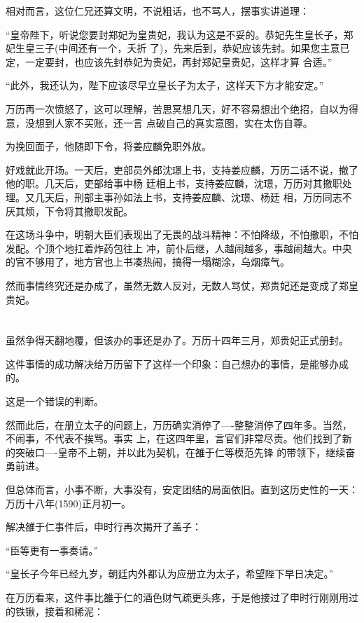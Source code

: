 \documentclass[11pt,a4paper,onecolumn]{article}
\begin{document}
相对而言，这位仁兄还算文明，不说粗话，也不骂人，摆事实讲道理：

``皇帝陛下，听说您要封郑妃为皇贵妃，我认为这是不妥的。恭妃先生皇长子，郑妃生皇三子(中间还有一个，夭折
了)，先来后到，恭妃应该先封。如果您主意已定，一定要封，也应该先封恭妃为贵妃，再封郑妃皇贵妃，这样才算
合适。''

``此外，我还认为，陛下应该尽早立皇长子为太子，这样天下方才能安定。''

万历再一次愤怒了，这可以理解，苦思冥想几天，好不容易想出个绝招，自以为得意，没想到人家不买账，还一言
点破自己的真实意图，实在太伤自尊。

为挽回面子，他随即下令，将姜应麟免职外放。

好戏就此开场。一天后，吏部员外郎沈璟上书，支持姜应麟，万历二话不说，撤了他的职。几天后，吏部给事中杨
廷相上书，支持姜应麟，沈璟，万历对其撤职处理。又几天后，刑部主事孙如法上书，支持姜应麟、沈璟、杨廷
相，万历同志不厌其烦，下令将其撤职发配。

在这场斗争中，明朝大臣们表现出了无畏的战斗精神：不怕降级，不怕撤职，不怕发配。个顶个地扛着炸药包往上
冲，前仆后继，人越闹越多，事越闹越大。中央的官不够用了，地方官也上书凑热闹，搞得一塌糊涂，乌烟瘴气。

然而事情终究还是办成了，虽然无数人反对，无数人骂仗，郑贵妃还是变成了郑皇贵妃。

\section[\thesection]{}

虽然争得天翻地覆，但该办的事还是办了。万历十四年三月，郑贵妃正式册封。

这件事情的成功解决给万历留下了这样一个印象：自己想办的事情，是能够办成的。

这是一个错误的判断。

然而此后，在册立太子的问题上，万历确实消停了----整整消停了四年多。当然，不闹事，不代表不挨骂。事实
上，在这四年里，言官们非常尽责。他们找到了新的突破口----皇帝不上朝，并以此为契机，在雒于仁等模范先锋
的带领下，继续奋勇前进。

但总体而言，小事不断，大事没有，安定团结的局面依旧。直到这历史性的一天：万历十八年(1590)正月初一。

解决雒于仁事件后，申时行再次揭开了盖子：

``臣等更有一事奏请。''

``皇长子今年已经九岁，朝廷内外都认为应册立为太子，希望陛下早日决定。''

在万历看来，这件事比雒于仁的酒色财气疏更头疼，于是他接过了申时行刚刚用过的铁锹，接着和稀泥：
\end{document}

